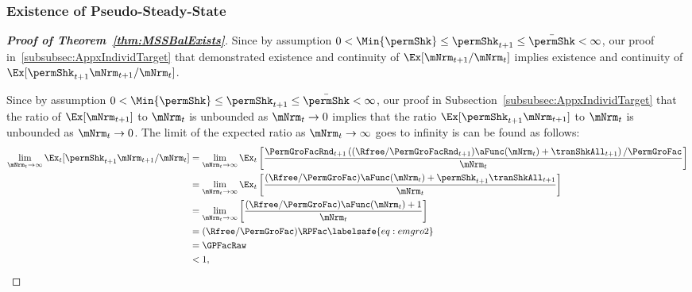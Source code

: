 \documentclass[\econtexRoot/BufferStockTheory]{subfiles}
\begin{document}
\subsubsection{Existence of Pseudo-Steady-State}\label{subsubsec:AppxPseudoSS}

\begin{proof}[\textbf{Proof of Theorem~\ref{thm:MSSBalExists}}]

Since by assumption $ 0 < \Min{\permShk} \leq \permShk_{t+1} \leq \bar{\permShk} < \infty$, our proof in~\ref{subsubsec:AppxIndividTarget} that demonstrated existence and continuity of $\Ex[\mNrm_{t+1}/\mNrm_{t}]$ implies existence and continuity of $\Ex[\permShk_{t+1}\mNrm_{t+1}/\mNrm_{t}]$.




Since by assumption $ 0 < \Min{\permShk} \leq \permShk_{t+1} \leq \bar{\permShk} < \infty$, our proof in Subsection~\ref{subsubsec:AppxIndividTarget} that the ratio of $\Ex[\mNrm_{t+1}]$ to $\mNrm_{t}$ is unbounded as $\mNrm_{t} \rightarrow 0$ implies that the ratio $\Ex[\permShk_{t+1}\mNrm_{t+1}]$ to $\mNrm_{t}$ is unbounded as $\mNrm_{t} \rightarrow 0$.
The limit of the expected ratio as $\mNrm_{t}\rightarrow \infty$ goes to infinity is can be found as follows:
%
\begin{equation}\begin{gathered}\begin{aligned}
  \lim_{\mNrm_{t} \rightarrow \infty} \Ex_{t}[\permShk_{t+1}\mNrm_{t+1}/\mNrm_{t}]  & =   
                                                                  \lim_{\mNrm_{t} \rightarrow \infty} 
                                                                  \Ex_{t}\left[\frac{\PermGroFacRnd_{t+1}\left((\Rfree/\PermGroFacRnd_{t+1})\aFunc(\mNrm_{t})+{\tranShkAll}_{t+1}\right)/\PermGroFac}{\mNrm_{t}}\right] \notag 
  \\   & =   \lim_{\mNrm_{t} \rightarrow \infty} \Ex_{t}\left[
         \frac{(\Rfree/\PermGroFac)\aFunc(\mNrm_{t})+\permShk_{t+1}{\tranShkAll}_{t+1}}{\mNrm_{t}}
         \right] \notag 
  \\   & =   \lim_{\mNrm_{t} \rightarrow \infty} \left[
         \frac{(\Rfree/\PermGroFac)\aFunc(\mNrm_{t})+1}{\mNrm_{t}}
         \right] \notag 
  \\  & = (\Rfree/\PermGroFac)\RPFac \labelsafe{eq:emgro2}
  \\  & = \GPFacRaw \notag
  \\  & < 1, \notag
\end{aligned}\end{gathered}\end{equation}


\end{proof}
\end{document}
